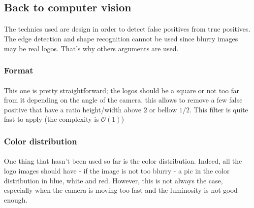 \documentclass[12pt]{article}%
\begin{document}
\subsection{Back to computer vision}

\paragraph{}
The technics used are design in order to detect false positives from true positives. The edge detection and shape recognition cannot be used since blurry images may be real logos. That's why others arguments are used.

\subsubsection{Format}
\paragraph{}
This one is pretty straightforward; the logos should be a square or not too far from it depending on the angle of the camera. this allows to remove a few false positive that have a ratio height/width above $2$ or bellow $1/2$. This filter is quite fast to apply (the complexity is $\mathcal{O}(1)$)

\subsubsection{Color distribution}
\paragraph{}
One thing that hasn't been used so far is the color distribution. Indeed, all the logo images should have - if the image is not too blurry - a pic in the color distribution in blue, white and red. However, this is not always the case, especially when the camera is moving too fast and the luminosity is not good enough.
\end{document}
